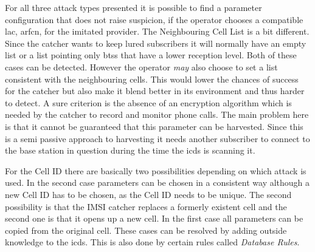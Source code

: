 For all three attack types presented it is possible to find a parameter configuration that does not raise suspicion, if the operator chooses a compatible \gls{lac}, \gls{arfcn}, \etc for the imitated provider. 
The Neighbouring Cell List is a bit different.
Since the catcher wants to keep lured subscribers it will normally have an empty list or a list pointing only \glspl{bts} that have a lower reception level. 
Both of these cases can be detected.
However the operator \emph{may} also choose to set a list consistent with the neighbouring cells.
This would lower the chances of success for the catcher but also make it blend better in its environment and thus harder to detect.
A sure criterion is the absence of an encryption algorithm which is needed by the catcher to record and monitor phone calls.
The main problem here is that it cannot be guaranteed that this parameter can be harvested.
Since this is a semi passive approach to harvesting it needs another subscriber to connect to the base station in question during the time the \gls{icds} is scanning it.

For the Cell ID there are basically two possibilities depending on which attack is used.
In the second case parameters can be chosen in a consistent way although a new Cell ID has to be chosen, as the Cell ID needs to be unique.
The second possibility is that the IMSI catcher replaces a formerly existent cell and the second one is that it opens up a new cell.
In the first case all parameters can be copied from the original cell.
These cases can be resolved by adding outside knowledge to the \gls{icds}.
This is also done by certain rules called \emph{Database Rules}.

